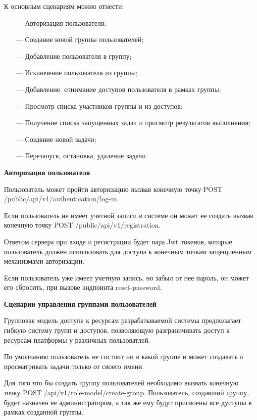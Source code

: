 К основным сценариям можно отнести:

\begin{itemize}
  \item[---] Авторизация пользователя;
  \item[---] Создание новой группы пользователей;
  \item[---] Добавление пользователя в группу;
  \item[---] Исключение пользователя из группы;
  \item[---] Добавление, отнимание доступов пользователя в рамках группы;
  \item[---] Просмотр списка участников группы и из доступов;
  \item[---] Получение списка запущенных задач и просмотр результатов выполнения;
  \item[---] Создвние новой задачи;
  \item[---] Перезапуск, остановка, удаление задачи.
\end{itemize}

{\bf Авторизация пользователя }

Пользователь может пройти авторизацию вызвав конечную точку POST /public/api/v1/authentication/log-in.

Если пользователь не имеет учетной записи в системе он может ее создать вызвав конечную точку POST /public/api/v1/registration.

Ответом сервера при входе и регистрации будет пара Jwt токенов\cite{ahmed2019authentication}, которые пользователь должен использовать для доступа к конечным точкам защещиенным механизмами авторизации.

Если пользователь уже имеет учетную запись, но забыл от нее пароль, он может его сбросить, при вызове эндпоинта reset-password.

{\bf Сценарии управления группами пользователей }

Групповая модель доступа к ресурсам разрабатываемой системы предполагает гибкую систему групп и доступов, позволяющую разграничивать доступ к ресурсам платформы у различных пользоватлей.

По умолчанию пользователь не состоит ни в какой группе и может создавать и просматривать задачи только от своего имени.

Для того что бы создать группу пользователей необходимо вызвать конечную точку POST /api/v1/role-model/create-group. Пользователь, создавший группу, будет назначен ее администратором, а так же ему будут присвоены все дуступы в рамках созданной группы.

